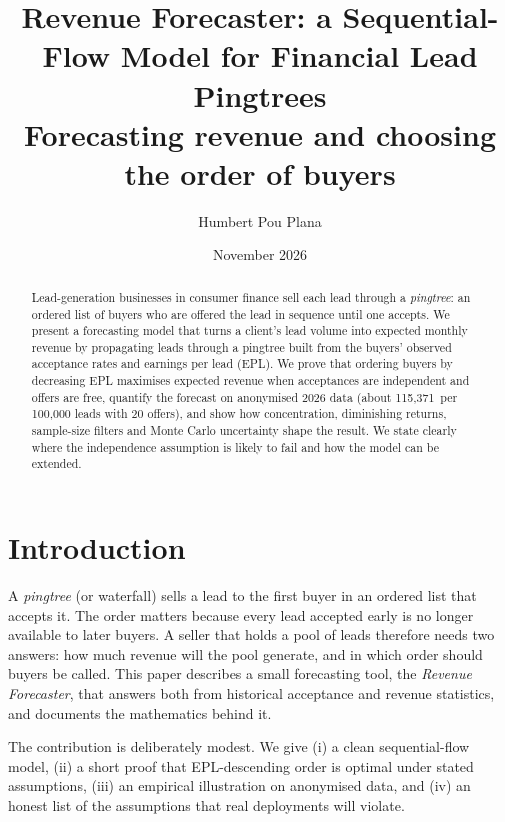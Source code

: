 \documentclass[10pt,a4paper]{article}
\begin{document}
\title{\bfseries Revenue Forecaster: a Sequential-Flow Model for Financial Lead Pingtrees\\[2pt]\large Forecasting revenue and choosing the order of buyers}
\author{Humbert Pou Plana}
\date{November 2026}
\maketitle
\begin{abstract}
Lead-generation businesses in consumer finance sell each lead through a \emph{pingtree}: an ordered list of buyers who are offered the lead in sequence until one accepts. We present a forecasting model that turns a client's lead volume into expected monthly revenue by propagating leads through a pingtree built from the buyers' observed acceptance rates and earnings per lead (EPL). We prove that ordering buyers by decreasing EPL maximises expected revenue when acceptances are independent and offers are free, quantify the forecast on anonymised 2026 data (about 115,371\,\texteuro{} per 100{,}000 leads with 20 offers), and show how concentration, diminishing returns, sample-size filters and Monte Carlo uncertainty shape the result. We state clearly where the independence assumption is likely to fail and how the model can be extended.
\end{abstract}

\section{Introduction}
A \emph{pingtree} (or waterfall) sells a lead to the first buyer in an ordered list that accepts it. The order matters because every lead accepted early is no longer available to later buyers. A seller that holds a pool of leads therefore needs two answers: how much revenue will the pool generate, and in which order should buyers be called. This paper describes a small forecasting tool, the \emph{Revenue Forecaster}, that answers both from historical acceptance and revenue statistics, and documents the mathematics behind it.

The contribution is deliberately modest. We give (i) a clean sequential-flow model, (ii) a short proof that EPL-descending order is optimal under stated assumptions, (iii) an empirical illustration on anonymised data, and (iv) an honest list of the assumptions that real deployments will violate.
\end{document}
